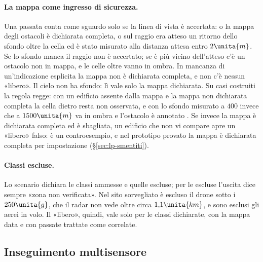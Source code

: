 \paragraph{La mappa come ingresso di sicurezza.} Una passata conta come sguardo solo se la linea di vista è accertata: o la mappa degli ostacoli è dichiarata completa, o sul raggio era atteso un ritorno dello sfondo oltre la cella ed è stato misurato alla distanza attesa entro $2\unita{m}$. Se lo sfondo manca il raggio non è accertato; se è più vicino dell'atteso c'è un ostacolo non in mappa, e le celle oltre vanno in ombra. In mancanza di un'indicazione esplicita la mappa non è dichiarata completa, e non c'è nessun «libero». Il cielo non ha sfondo: lì vale solo la mappa dichiarata. Su casi costruiti la regola regge: con un edificio assente dalla mappa e la mappa non dichiarata completa la cella dietro resta non osservata, e con lo sfondo misurato a $400$ invece che a $1500\unita{m}$ va in ombra e l'ostacolo è annotato . Se invece la mappa è dichiarata completa ed è sbagliata, un edificio che non vi compare apre un «libero» falso: è un controesempio, e nel prototipo provato la mappa è dichiarata completa per impostazione (\S\ref{sec:lp-smentiti}).

\paragraph{Classi escluse.} Lo scenario dichiara le classi ammesse e quelle escluse; per le escluse l'uscita dice sempre «zona non verificata». Nel sito sorvegliato è escluso il drone sotto i $250\unita{g}$, che il radar non vede oltre circa $1{,}1\unita{km}$, e sono esclusi gli aerei in volo. Il «libero», quindi, vale solo per le classi dichiarate, con la mappa data e con passate trattate come correlate.

\subsection{Inseguimento multisensore}\label{sec:lp-inseguimento}

